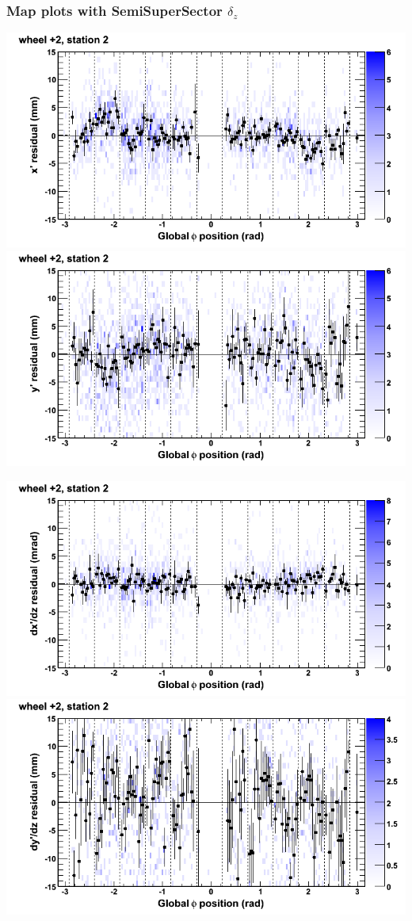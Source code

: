 \documentclass[compress]{beamer}
\begin{document}
\begin{frame}
\frametitle{Map plots with SemiSuperSector $\delta_z$}
\includegraphics[width=0.5\linewidth]{zfit_mapplots/DTvsphi_st2whE_x.png}
\includegraphics[width=0.5\linewidth]{zfit_mapplots/DTvsphi_st2whE_y.png}

\includegraphics[width=0.5\linewidth]{zfit_mapplots/DTvsphi_st2whE_dxdz.png}
\includegraphics[width=0.5\linewidth]{zfit_mapplots/DTvsphi_st2whE_dydz.png}
\end{frame}
\end{document}
